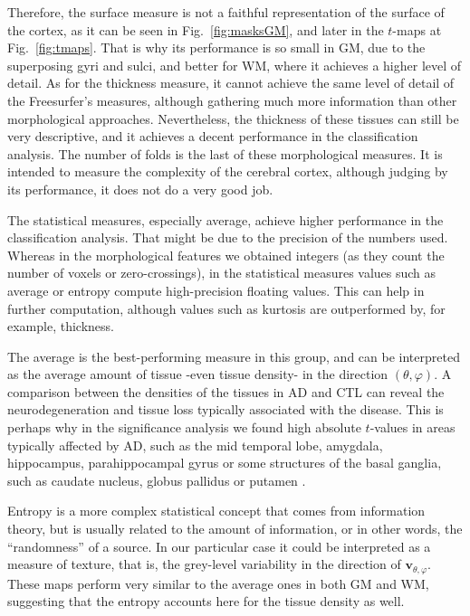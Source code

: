 Therefore, the surface measure is not a faithful representation of the surface of the cortex, as it can be seen in Fig.~\ref{fig:masksGM}, and later in the $t$-maps at Fig.~\ref{fig:tmaps}. That is why its performance is so small in \ac{GM}, due to the superposing gyri and sulci, and better for \ac{WM}, where it achieves a higher level of detail. As for the thickness measure, it cannot achieve the same level of detail of the Freesurfer's measures, although gathering much more information than other morphological approaches. Nevertheless, the thickness of these tissues can still be very descriptive, and it achieves a decent performance in the classification analysis. The number of folds is the last of these morphological measures. It is intended to measure the complexity of the cerebral cortex, although judging by its performance, it does not do a very good job. 

The statistical measures, especially average, achieve higher performance in the classification analysis. That might be due to the precision of the numbers used. Whereas in the morphological features we obtained integers (as they count the number of voxels or zero-crossings), in the statistical measures values such as average or entropy compute high-precision floating values. This can help in further computation, although values such as kurtosis are outperformed by, for example, thickness. 

The average is the best-performing measure in this group, and can be interpreted as the average amount of tissue -even tissue density- in the direction $(\theta,\varphi)$. A comparison between the densities of the tissues in \ac{AD} and \ac{CTL} can reveal the neurodegeneration and tissue loss typically associated with the disease. This is perhaps why in the significance analysis we found high absolute $t$-values in areas typically affected by \ac{AD}, such as the mid temporal lobe, amygdala, hippocampus, parahippocampal gyrus or some structures of the basal ganglia, such as caudate nucleus, globus pallidus or putamen \cite{Dubois2007,Pievani2013}. 

Entropy is a more complex statistical concept that comes from information theory, but is usually related to the amount of information, or in other words, the ``randomness'' of a source. In our particular case it could be interpreted as a measure of texture, that is, the grey-level variability in the direction of $\mathbf{v}_{\theta,\varphi}$. These maps perform very similar to the average ones in both \ac{GM} and \ac{WM}, suggesting that the entropy  accounts here for the tissue density as well. 

